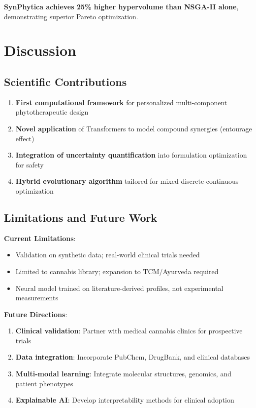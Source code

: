 \documentclass[12pt, a4paper]{article}
\begin{document}
\textbf{SynPhytica achieves 25\% higher hypervolume than NSGA-II alone}, demonstrating superior Pareto optimization.

\section{Discussion}

\subsection{Scientific Contributions}

\begin{enumerate}
    \item \textbf{First computational framework} for personalized multi-component phytotherapeutic design
    \item \textbf{Novel application} of Transformers to model compound synergies (entourage effect)
    \item \textbf{Integration of uncertainty quantification} into formulation optimization for safety
    \item \textbf{Hybrid evolutionary algorithm} tailored for mixed discrete-continuous optimization
\end{enumerate}

\subsection{Limitations and Future Work}

\textbf{Current Limitations}:
\begin{itemize}
    \item Validation on synthetic data; real-world clinical trials needed
    \item Limited to cannabis library; expansion to TCM/Ayurveda required
    \item Neural model trained on literature-derived profiles, not experimental measurements
\end{itemize}

\textbf{Future Directions}:
\begin{enumerate}
    \item \textbf{Clinical validation}: Partner with medical cannabis clinics for prospective trials
    \item \textbf{Data integration}: Incorporate PubChem, DrugBank, and clinical databases
    \item \textbf{Multi-modal learning}: Integrate molecular structures, genomics, and patient phenotypes
    \item \textbf{Explainable AI}: Develop interpretability methods for clinical adoption
\end{enumerate}
\end{document}
